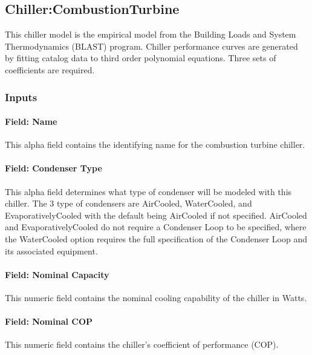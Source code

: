 \subsection{Chiller:CombustionTurbine}\label{chillercombustionturbine}

This chiller model is the empirical model from the Building Loads and System Thermodynamics (BLAST) program. Chiller performance curves are generated by fitting catalog data to third order polynomial equations. Three sets of coefficients are required.

\subsubsection{Inputs}\label{inputs-7-018}

\paragraph{Field: Name}\label{field-name-6-015}

This alpha field contains the identifying name for the combustion turbine chiller.

\paragraph{Field: Condenser Type}\label{field-condenser-type-4-000}

This alpha field determines what type of condenser will be modeled with this chiller. The 3 type of condensers are AirCooled, WaterCooled, and EvaporativelyCooled with the default being AirCooled if not specified. AirCooled and EvaporativelyCooled do not require a Condenser Loop to be specified, where the WaterCooled option requires the full specification of the Condenser Loop and its associated equipment.

\paragraph{Field: Nominal Capacity}\label{field-nominal-capacity-5}

This numeric field contains the nominal cooling capability of the chiller in Watts.

\paragraph{Field: Nominal COP}\label{field-nominal-cop-3}

This numeric field contains the chiller's coefficient of performance (COP).

